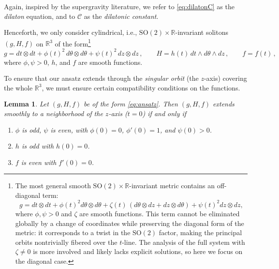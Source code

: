 \documentclass[12pt,a4paper,reqno]{amsart}
\theoremstyle{plain}
\newtheorem{lemma}[theorem]{Lemma}
\theoremstyle{remark}
\numberwithin{equation}{section}
\newcommand{\cC}{\mathcal{C}}
\newcommand{\SO}{\mathrm{SO}}
\newcommand{\R}{\mathbb{R}}
\begin{document}
Again, inspired by the supergravity literature, we refer to \eqref{eq:dilatonC} as the \emph{dilaton} equation, and to $\cC$ as the \emph{dilatonic constant}.

Henceforth, we only consider cylindrical, i.e., $\SO(2) \times \R$-invariant  solitons $(g, H, f)$ on $\R^3$ of the form\footnote{The most general smooth $\SO(2) \times \R$-invariant metric contains an off-diagonal term:
\begin{equation*}
g = dt \otimes dt + \phi(t)^2 d\theta \otimes d\theta + \zeta(t)\,(d\theta \otimes dz + dz \otimes d\theta) + \psi(t)^2 dz \otimes dz,
\end{equation*}
where $\phi, \psi > 0$ and $\zeta$ are smooth functions. This term cannot be eliminated globally by a change of coordinates while preserving the diagonal form of the metric: it corresponds to a twist in the $\SO(2)$ factor, making the principal orbits nontrivially fibered over the $t$-line. The analysis of the full system with $\zeta \neq 0$ is more involved and likely lacks explicit solutions, so here we focus on the diagonal case.}
\begin{equation}\label{eq:ansatz}
g = dt \otimes dt + \phi(t)^2 \,d\theta \otimes d\theta + \psi(t)^2 \,dz \otimes dz \,, \qquad H = h(t) \,dt \wedge d\theta \wedge dz \,, \qquad f = f(t) \,,
\end{equation}
where $\phi,\psi>0$, $h$, and $f$ are smooth functions.

To ensure that our ansatz extends through the \emph{singular orbit} (the $z$-axis) covering the whole $\R^3$, we must ensure certain compatibility conditions on the functions.

\begin{lemma}\label{lemma:smoothnessconditions}
Let $(g,H,f)$ be of the form \eqref{eq:ansatz}. Then $(g,H,f)$ extends smoothly to a neighborhood of the $z$-axis ($t=0$) if and only if
\begin{enumerate}[label=(\roman*), leftmargin=*, topsep=5pt, itemsep=5pt]
\item $\phi$ is odd, $\psi$ is even, with $\phi(0)=0$, $\phi'(0)=1$, and $\psi(0)>0$.
\item $h$ is odd with $h(0)=0$.
\item $f$ is even with $f'(0)=0$.
\end{enumerate}
\end{lemma}
\end{document}
